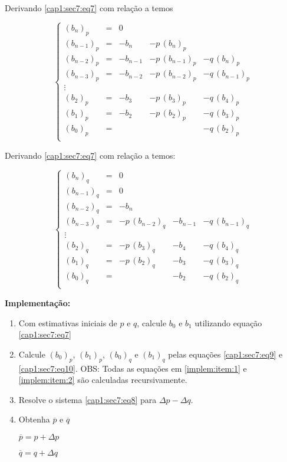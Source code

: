 Derivando \ref{cap1:sec7:eq7} com relação a  temos

\begin{equation}
 \label{cap1:sec7:eq9}
 \left\{
 \begin{array}{cllll}
  (b_n)_p & = & 0 & & \\
  (b_{n-1})_p & = & -b_n & - p\,(b_n)_p & \\
  (b_{n-2})_p & = & -b_{n-1} & - p\,(b_{n-1})_p & - q\,(b_n)_p \\
  (b_{n-3})_p & = & -b_{n-2} & - p\,(b_{n-2})_p & - q\,(b_{n-1})_p \\
  \vdots  & \\
  (b_2)_p & = & -b_3 & - p\,(b_3)_p & - q\,(b_4)_p \\
  (b_1)_p & = & -b_2 & - p\,(b_2)_p & - q\,(b_3)_p \\
  (b_0)_p & = &      &              & - q\,(b_2)_p \\
 \end{array}
 \right.
\end{equation}

Derivando \ref{cap1:sec7:eq7} com relação a  temos:

\begin{equation}
 \label{cap1:sec7:eq10}
 \left\{
 \begin{array}{cllll}
  (b_n)_q & = & 0 & & \\
  (b_{n-1})_q & = & 0 & & \\
  (b_{n-2})_q & = & -b_n & & \\
  (b_{n-3})_q & = & - p\,(b_{n-2})_q & - b_{n-1} & - q\,(b_{n-1})_q \\
  \vdots  & \\
  (b_2)_q & = & - p\,(b_3)_q & - b_4 & - q\,(b_4)_q \\
  (b_1)_q & = & - p\,(b_2)_q & - b_3 & - q\,(b_3)_q \\
  (b_0)_q & = &              & - b_2 & - q\,(b_2)_q \\
 \end{array}
 \right.
\end{equation}

\textbf{Implementação:}

\begin{enumerate}
\item Com estimativas iniciais de $p$ e $q$, calcule $b_{0}$ e $b_{1}$ utilizando equação \ref{cap1:sec7:eq7}
\label{implem:item:1}

\item Calcule $(b_{0})_{p}$, $(b_{1})_{p}$, $(b_{0})_{q}$ e $(b_{1})_{q}$ pelas equações \ref{cap1:sec7:eq9} e \ref{cap1:sec7:eq10}.
\label{implem:item:2}
OBS: Todas as equações em \ref{implem:item:1} e \ref{implem:item:2} são calculadas recursivamente.

\item Resolve o sistema \ref{cap1:sec7:eq8} para $\Delta p - \Delta q$.

\item Obtenha $\overline{p}$ e $\overline{q}$
\label{implem:item:4}

$\overline{p} = p + \Delta p$

$\overline{q} = q + \Delta q$

\end{enumerate}

